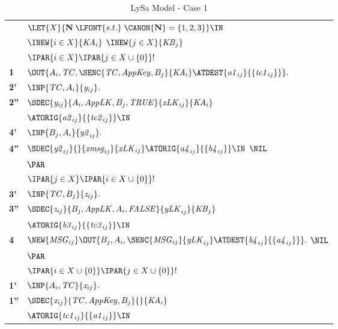 \begin{table}\caption{LySa Model - Case 1}
\label{tab:lysaC1}
\centering
\begin{tabular}{l@{}l}
\hline
             & $\LET{X}{\mathbf{N}\;\LFONT{s.t.}\;\CANON{\mathbf{N}} = \{1,2,3\}}\IN$\\
             & $\INEW{i\in X}{\mathit{KA}_{i}}$ $\INEW{j\in X}{\mathit{KB}_{j}}$\\


& $\IPAR{i\in X}\IPAR{j\in X\cup \{ 0 \}} !$\\
\textbf{1}   & $\OUT{A_{i}, \mathit{TC}, \SENC{\mathit{TC}, \mathit{AppKey}, B_{j}}{\mathit{KA}_{i}}\ATDEST{\mathit{a1}_{i j}}{\{\mathit{tc1}_{i j}\}}}.$\\
\textbf{2'}  & $\INP{\mathit{TC}, A_{i}}{\mathit{y}_{i j}}.$\\
\textbf{2''} & $\SDEC{\mathit{y}_{i j}}{A_{i}, \mathit{AppLK}, B_{j}, \mathit{TRUE}}{\mathit{xLK}_{i j}}{\mathit{KA}_{i}}$\\
              & $\ATORIG{\mathit{a2}_{i j}}{\{\mathit{tc2}_{i j}\}}\IN$\\
\textbf{4'}  & $\INP{B_{j}, A_{i}}{\mathit{y2}_{i j}}.$\\
\textbf{4'' } & $\SDEC{\mathit{y2}_{i j}}{}{\mathit{xmsg}_{i j}}{\mathit{xLK}_{i j}}\ATORIG{\mathit{a4}_{i j}}{\{\mathit{b4}_{i j}\}}\IN$ $\NIL$\\
              & $\PAR$\\
& $\IPAR{j\in X}\IPAR{i\in X\cup \{ 0 \}} !$\\
\textbf{3'}  & $\INP{\mathit{TC}, B_{j}}{\mathit{z}_{i j}}.$\\
\textbf{3''} & $\SDEC{\mathit{z}_{i j}}{B_{j}, \mathit{AppLK}, A_{i}, \mathit{FALSE}}{\mathit{yLK}_{i j}}{\mathit{KB}_{j}}$\\
              & $\ATORIG{\mathit{b3}_{i j}}{\{\mathit{tc3}_{i j}\}}\IN$\\
\textbf{4}   & $\NEW{\mathit{MSG}_{i j}} \OUT{B_{j}, A_{i}, \SENC{\mathit{MSG}_{i j}}{\mathit{yLK}_{i j}}\ATDEST{\mathit{b4}_{i j}}{\{\mathit{a4}_{i j}\}}}.$ $\NIL$\\
              & $\PAR$\\
& $\IPAR{i\in X\cup \{ 0 \}}\IPAR{j\in X\cup \{ 0 \}} !$\\
\textbf{1'}  & $\INP{A_{i}, \mathit{TC}}{\mathit{x}_{i j}}.$\\
\textbf{1''} & $\SDEC{\mathit{x}_{i j}}{\mathit{TC}, \mathit{AppKey}, B_{j}}{}{\mathit{KA}_{i}}$\\
              & $\ATORIG{\mathit{tc1}_{i j}}{\{\mathit{a1}_{i j}\}}\IN$\\

\end{tabular}
\end{table}
